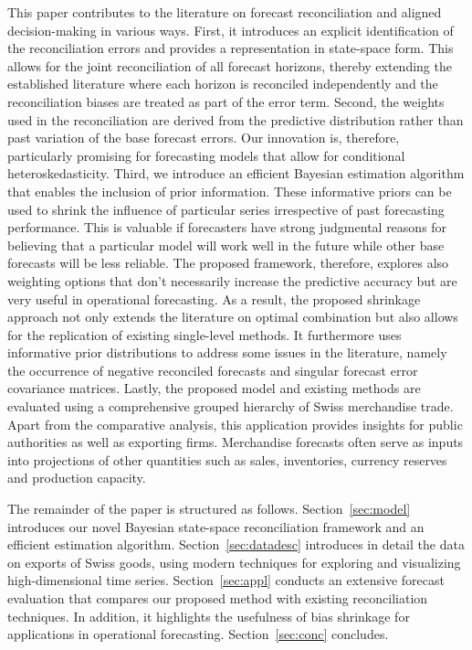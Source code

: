 \documentclass[a4paper,fleqn,11pt]{article}
\begin{document}
This paper contributes to the literature on forecast reconciliation and aligned decision-making in various ways. First, it introduces an explicit identification of the reconciliation errors and provides a representation in state-space form. This allows for the joint reconciliation of all forecast horizons, thereby extending the established literature where each horizon is reconciled independently and the reconciliation biases are treated as part of the error term. Second, the weights used in the reconciliation are derived from the predictive distribution rather than past variation of the base forecast errors. Our innovation is, therefore, particularly promising for forecasting models that allow for conditional heteroskedasticity. Third, we introduce an efficient Bayesian estimation algorithm that enables the inclusion of prior information. These informative priors can be used to shrink the influence of particular series irrespective of past forecasting performance. This is valuable if forecasters have strong judgmental reasons for believing that a particular model will work well in the future while other base forecasts will be less reliable. The proposed framework, therefore, explores also weighting options that don't necessarily increase the predictive accuracy but are very useful in operational forecasting. As a result, the proposed shrinkage approach not only extends the literature on optimal combination but also allows for the replication of existing single-level methods. It furthermore uses informative prior distributions to address some issues in the literature, namely the occurrence of negative reconciled forecasts and singular forecast error covariance matrices. Lastly, the proposed model and existing methods are evaluated using a comprehensive grouped hierarchy of Swiss merchandise trade. Apart from the comparative analysis, this application provides insights for public authorities as well as exporting firms. Merchandise forecasts often serve as inputs into projections of other quantities such as sales, inventories, currency reserves and production capacity.

The remainder of the paper is structured as follows. Section~\ref{sec:model} introduces our novel Bayesian state-space reconciliation framework and an efficient estimation algorithm.  Section~\ref{sec:datadesc} introduces in detail the data on exports of Swiss goods, using modern techniques for exploring and visualizing high-dimensional time series.  Section~\ref{sec:appl} conducts an extensive forecast evaluation that compares our proposed method with existing reconciliation techniques. In addition, it highlights the usefulness of bias shrinkage for applications in operational forecasting. Section~\ref{sec:conc} concludes.
\end{document}
